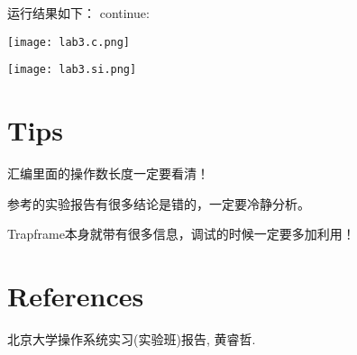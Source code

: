 \documentclass[11pt]{article}
\newenvironment{packed_enum}{
\begin{enumerate}
  \setlength{\itemsep}{1pt}
  \setlength{\parskip}{0pt}
  \setlength{\parsep}{0pt}
}{\end{enumerate}}
\begin{document}
运行结果如下：
continue:
\begin{center}
\texttt{[image: lab3.c.png]}
\end{center}

\begin{center}
\texttt{[image: lab3.si.png]}
\end{center}

\section{Tips}
\begin{packed_enum}
\item 汇编里面的操作数长度一定要看清！
\item 参考的实验报告有很多结论是错的，一定要冷静分析。
\item Trapframe本身就带有很多信息，调试的时候一定要多加利用！
\end{packed_enum}

\section{References}
北京大学操作系统实习(实验班)报告, 黄睿哲.
\end{document}
